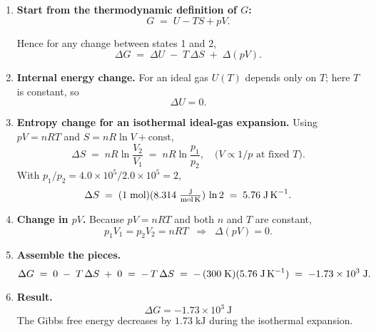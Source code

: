 \documentclass[12pt]{article}
\theoremstyle{definition} %
\theoremstyle{plain} %
\begin{document}
\begin{enumerate}
\item \textbf{Start from the thermodynamic definition of \(G\):}
  \[
     G \;=\; U - TS + pV .
  \]

  Hence for any change between states 1 and 2,
  \[
     \Delta G \;=\; \Delta U \;-\; T\,\Delta S \;+\; \Delta(pV).
  \]

\item \textbf{Internal energy change.}  
      For an ideal gas \(U(T)\) depends only on \(T\); here \(T\) is constant, so
      \[
        \boxed{\Delta U = 0 } .
      \]

\item \textbf{Entropy change for an isothermal ideal-gas expansion.}  
      Using \(pV = nRT\) and \(S = nR\ln V + \text{const}\),
      \[
         \Delta S
         \;=\;
         nR\ln\!\frac{V_2}{V_1}
         \;=\;
         nR\ln\!\frac{p_1}{p_2},
         \quad
         \bigl(V\propto 1/p \text{ at fixed } T\bigr).
      \]
      With \(p_1/p_2 = 4.0\times10^{5}/2.0\times10^{5}=2\),
      \[
         \Delta S
         \;=\;
         (1\;\text{mol})(8.314\;\tfrac{\text{J}}{\text{mol\,K}})\,
         \ln 2
         \;=\;
         5.76\;\text{J\,K}^{-1}.
      \]

\item \textbf{Change in \(pV\).}  
      Because \(pV = nRT\) and both \(n\) and \(T\) are constant,
      \[
        p_1V_1 = p_2V_2 = nRT
        \;\;\Longrightarrow\;\;
        \boxed{\Delta(pV)=0 } .
      \]

\item \textbf{Assemble the pieces.}
      \[
        \Delta G
        \;=\;
        0
        \;-\;
        T\,\Delta S
        \;+\;
        0
        \;=\;
        -\,T\,\Delta S
        \;=\;
        -\,(300\;\text{K})(5.76\;\text{J\,K}^{-1})
        \;=\;
        -1.73\times10^{3}\;\text{J}.
      \]

\item \textbf{Result.}
      \[
        \boxed{\displaystyle \Delta G = -1.73 \times 10^{3}\ \text{J}}
      \]
      The Gibbs free energy decreases by \(1.73\;\text{kJ}\) during the
      isothermal expansion.
\end{enumerate}
\end{document}
